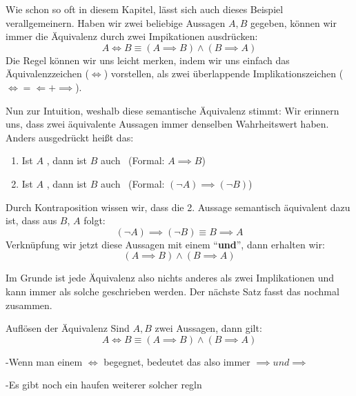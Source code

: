 \documentclass[../../main.tex]{subfiles}
\newcommand{\statement}[1]{\textrm{\enquote{\textbf{#1}}}}
\def\wahr{\text{\color{green!50!black}wahr}}
\def\falsch{\text{\color{red!80!black}falsch}}
\begin{document}
    Wie schon so oft in diesem Kapitel, lässt sich auch dieses Beispiel verallgemeinern.
     Haben wir zwei beliebige Aussagen $A,B$ gegeben, können wir immer die Äquivalenz
     durch zwei Impikationen ausdrücken:
    \[A \iff B \equiv (A \implies B) \land (B \implies A)\]
    Die Regel können wir uns leicht merken, indem wir uns einfach das Äquivalenzzeichen
    ($\iff$) vorstellen, als zwei überlappende Implikationszeichen ($\iff = \Longleftarrow + \implies$).

    Nun zur Intuition, weshalb diese semantische Äquivalenz stimmt: Wir erinnern uns, dass zwei äquivalente Aussagen 
    immer denselben Wahrheitswert haben. Anders ausgedrückt heißt das:
    \begin{enumerate}
        \item Ist $A$ \wahr, dann ist $B$ auch \wahr\  (Formal: $A \implies B$)
        \item Ist $A$ \falsch, dann ist $B$ auch \falsch\  (Formal: $(\lnot A) \implies (\lnot B)$)
    \end{enumerate}
    Durch Kontraposition wissen wir, dass die 2. Aussage semantisch äquivalent dazu ist,
    dass aus $B$, $A$ folgt:
    \[(\lnot A) \implies (\lnot B) \equiv B \implies A\]
    Verknüpfung wir jetzt diese Aussagen mit einem \statement{und}, dann erhalten wir:
    \[(A \implies B) \land (B \implies A)\]
    
    Im Grunde ist jede Äquivalenz also nichts anderes als zwei Implikationen und kann immer als solche geschrieben werden. 
    Der nächste Satz fasst das nochmal zusammen.
    
    \begin{lemma}{Auflösen der Äquivalenz}
    Sind $A,B$ zwei Aussagen, dann gilt:
        \[ A \iff B \equiv (A \implies B) \land (B \implies A)\]
    \end{lemma}
    
    -Wenn man einem $\iff$ begegnet, bedeutet das also immer $\implies und \implies$
    
    -Es gibt noch ein haufen weiterer solcher regln
    
\end{document}
